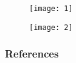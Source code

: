 \documentclass[
    8pt,
    aspectratio=1610,
    c,
    intlimits,
    leqno,
    professionalfonts,
]{beamer}
\begin{document}
\begin{frame}
	\begin{figure}[ht!]
		\centering
		\texttt{[image: 1]}
	\end{figure}
\end{frame}

\begin{frame}
	\begin{figure}[ht!]
		\centering
		\texttt{[image: 2]}
	\end{figure}
\end{frame}

\begin{frame}
	\frametitle{References}

	\nocite{*}
	\printbibliography[heading=none]
\end{frame}
\end{document}
